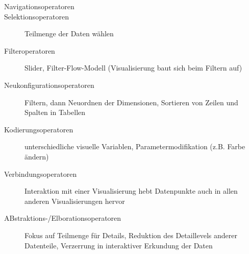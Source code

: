\begin{description}
	\item[Navigationsoperatoren]
	\item[Selektionsoperatoren] Teilmenge der Daten wählen
	\item[Filteroperatoren] Slider, Filter-Flow-Modell (Visualisierung baut sich beim Filtern auf)
	\item[Neukonfigurationsoperatoren] Filtern, dann Neuordnen der Dimensionen, Sortieren von Zeilen und Spalten in Tabellen
	\item[Kodierungsoperatoren] unterschiedliche visuelle Variablen, Parametermodifikation (z.B. Farbe ändern)
	\item[Verbindungsoperatoren] Interaktion mit einer Visualisierung hebt Datenpunkte auch in allen anderen Visualisierungen hervor
	\item[ABstraktions-/Elborationsoperatoren] Fokus auf Teilmenge für Details, Reduktion des Detaillevels anderer Datenteile, Verzerrung in interaktiver Erkundung der Daten
\end{description}